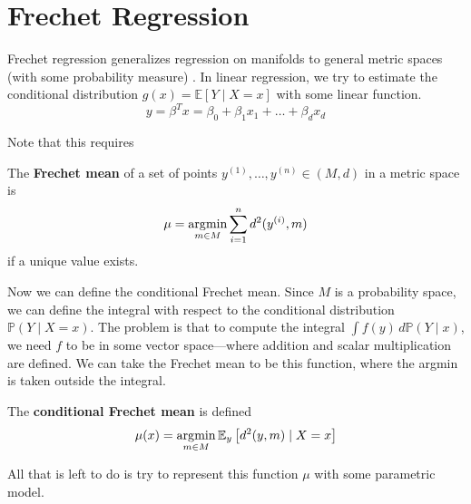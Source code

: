 \section{Frechet Regression} 

  Frechet regression generalizes regression on manifolds to general metric spaces (with some probability measure) \cite{2017petersen}. In linear regression, we try to estimate the conditional distribution $g(x) = \mathbb{E}[Y \mid X = x]$ with some linear function. 
  \begin{equation}
    y = \beta^T x = \beta_0 + \beta_1 x_1 + \ldots + \beta_d x_d
  \end{equation}

  Note that this requires 

  \begin{definition}
    The \textbf{Frechet mean} of a set of points $y^{(1)}, \ldots, y^{(n)} \in (M, d)$ in a metric space is 
    \begin{equation}
      \mu = \operatorname*{\arg\!\min}_{m \in M} \sum_{i=1}^n d^2 (y^{(i)}, m)
    \end{equation} 
    if a unique value exists. 
  \end{definition}

  Now we can define the conditional Frechet mean. Since $M$ is a probability space, we can define the integral with respect to the conditional distribution $\mathbb{P}(Y \mid X = x)$. The problem is that to compute the integral $\int f(y) \,d \mathbb{P}(Y \mid x)$, we need $f$ to be in some vector space---where addition and scalar multiplication are defined. We can take the Frechet mean to be this function, where the argmin is taken outside the integral. 

  \begin{definition}
    The \textbf{conditional Frechet mean} is defined 
    \begin{equation}
      \mu(x) = \operatorname*{\arg\!\min}_{m \in M} \mathbb{E}_{y} \left[ d^2 (y, m) \mid X = x \right]
    \end{equation}
  \end{definition}

  All that is left to do is try to represent this function $\mu$ with some parametric model. 
